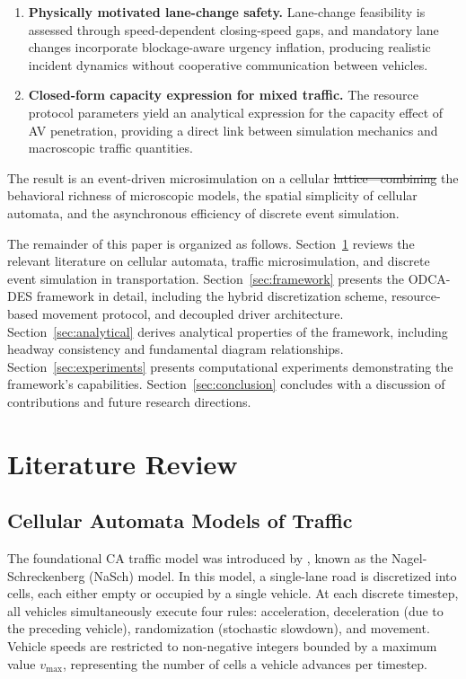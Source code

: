 \documentclass[review,authoryear]{elsarticle}
\providecommand{\DIFaddtex}[1]{{\protect\color{blue}\uwave{#1}}} %
\providecommand{\DIFdeltex}[1]{{\protect\color{red}\sout{#1}}}                      %
\providecommand{\DIFaddbegin}{} %
\providecommand{\DIFaddend}{} %
\providecommand{\DIFdelbegin}{} %
\providecommand{\DIFdelend}{} %
\providecommand{\DIFadd}[1]{\texorpdfstring{\DIFaddtex{#1}}{#1}} %
\providecommand{\DIFdel}[1]{\texorpdfstring{\DIFdeltex{#1}}{}} %
\newcommand{\DIFscaledelfig}{0.5}
\newlength{\DIFdelgraphicswidth} %
\newlength{\DIFdelgraphicsheight} %
\newcommand{\DIFaddincludegraphics}[2][]{{\color{blue}\fbox{\DIFOincludegraphics[#1]{#2}}}} %
\newcommand{\DIFdelincludegraphics}[2][]{%
\sbox{\DIFdelgraphicsbox}{\DIFOincludegraphics[#1]{#2}}%
\settoboxwidth{\DIFdelgraphicswidth}{\DIFdelgraphicsbox} %
\settoboxtotalheight{\DIFdelgraphicsheight}{\DIFdelgraphicsbox} %
\scalebox{\DIFscaledelfig}{%
\parbox[b]{\DIFdelgraphicswidth}{\usebox{\DIFdelgraphicsbox}\\[-\baselineskip] \rule{\DIFdelgraphicswidth}{0em}}\llap{\resizebox{\DIFdelgraphicswidth}{\DIFdelgraphicsheight}{%
\setlength{\unitlength}{\DIFdelgraphicswidth}%
\begin{picture}(1,1)%
\thicklines\linethickness{2pt} %
{\color[rgb]{1,0,0}\put(0,0){\framebox(1,1){}}}%
{\color[rgb]{1,0,0}\put(0,0){\line( 1,1){1}}}%
{\color[rgb]{1,0,0}\put(0,1){\line(1,-1){1}}}%
\end{picture}%
}\hspace*{3pt}}} %
} %
\DeclareRobustCommand{\DIFaddbegin}{\DIFOaddbegin \let\includegraphics\DIFaddincludegraphics} %
\DeclareRobustCommand{\DIFaddend}{\DIFOaddend \let\includegraphics\DIFOincludegraphics} %
\DeclareRobustCommand{\DIFdelbegin}{\DIFOdelbegin \let\includegraphics\DIFdelincludegraphics} %
\DeclareRobustCommand{\DIFdelend}{\DIFOaddend \let\includegraphics\DIFOincludegraphics} %
\begin{document}
\begin{enumerate}
    \item \textbf{Physically motivated lane-change safety.} Lane-change feasibility is assessed through speed-dependent closing-speed gaps, and mandatory lane changes incorporate blockage-aware urgency inflation, producing realistic incident dynamics without cooperative communication between vehicles.

    \item \textbf{Closed-form capacity expression for mixed traffic.} The resource protocol parameters yield an analytical expression for the capacity effect of AV penetration, providing a direct link between simulation mechanics and macroscopic traffic quantities.
\end{enumerate}

The result is an event-driven microsimulation on a cellular \DIFdelbegin \DIFdel{lattice---combining }\DIFdelend \DIFaddbegin \DIFadd{lattice, combining }\DIFaddend the behavioral richness of microscopic models, the spatial simplicity of cellular automata, and the asynchronous efficiency of discrete event simulation.

The remainder of this paper is organized as follows. Section~\ref{sec:literature} reviews the relevant literature on cellular automata, traffic microsimulation, and discrete event simulation in transportation. Section~\ref{sec:framework} presents the ODCA-DES framework in detail, including the hybrid discretization scheme, resource-based movement protocol, and decoupled driver architecture. Section~\ref{sec:analytical} derives analytical properties of the framework, including headway consistency and fundamental diagram relationships. Section~\ref{sec:experiments} presents computational experiments demonstrating the framework's capabilities. Section~\ref{sec:conclusion} concludes with a discussion of contributions and future research directions.


\section{Literature Review}
\label{sec:literature}

\subsection{Cellular Automata Models of Traffic}
\label{sec:lit_ca}

The foundational CA traffic model was introduced by \citet{nagel1992cellular}, known as the Nagel-Schreckenberg (NaSch) model. In this model, a single-lane road is discretized into cells, each either empty or occupied by a single vehicle. At each discrete timestep, all vehicles simultaneously execute four rules: acceleration, deceleration (due to the preceding vehicle), randomization (stochastic slowdown), and movement. Vehicle speeds are restricted to non-negative integers bounded by a maximum value $v_{\max}$, representing the number of cells a vehicle advances per timestep.
\end{document}
